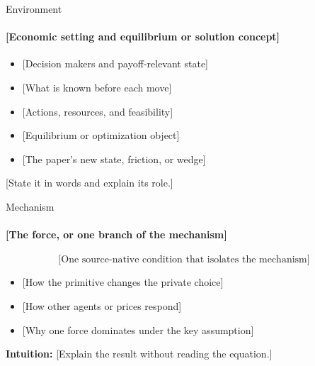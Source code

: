 \documentclass[11pt, aspectratio=169]{beamer}
\begin{document}
\begin{frame}{Environment}
  \framesubtitle{[Economic setting and equilibrium or solution concept]}
  \medskip
  \begin{itemize}\setlength{\itemsep}{0.64em}
    \item {} [Decision makers and payoff-relevant state]
    \item {} [What is known before each move]
    \item {} [Actions, resources, and feasibility]
    \item {} [Equilibrium or optimization object]
    \item {} \textcolor{cNewObject}{[The paper's new state, friction, or wedge]}
  \end{itemize}

  \bigskip
   [State it in words and explain its role.]
  \hypertarget{main:assumption}{}%
\end{frame}

\begin{frame}{Mechanism}
  \framesubtitle{[The force, or one branch of the mechanism]}
  \medskip
  \[
    \text{[One source-native condition that isolates the mechanism]}
  \]
  \begin{itemize}\setlength{\itemsep}{0.58em}
    \item \textcolor{cChannelA}{} [How the primitive changes the private choice]
    \item \textcolor{cChannelB}{} [How other agents or prices respond]
    \item {} [Why one force dominates under the key assumption]
  \end{itemize}

  \medskip
  \textbf{Intuition:} [Explain the result without reading the equation.]
\end{frame}
\end{document}

